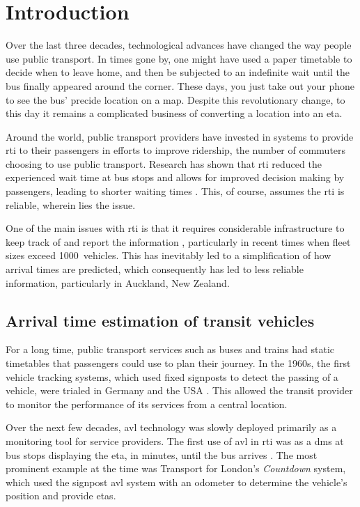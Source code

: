 \glsresetall

\chapter{Introduction}
\label{cha:intro}

Over the last three decades, technological advances have changed the way people use public transport. In times gone by, one might have used a paper timetable to decide when to leave home, and then be subjected to an indefinite wait until the bus finally appeared around the corner. These days, you just take out your phone to see the bus' precide location on a map. Despite this revolutionary change, to this day it remains a complicated business of converting a location into an \gls{eta}.


Around the world, public transport providers have invested in systems to provide \gls{rti} to their passengers in efforts to improve ridership, the number of commuters choosing to use public transport. Research has shown that \gls{rti} reduced the experienced wait time at bus stops \citep{TCRP_2003} and allows for improved decision making by passengers, leading to shorter waiting times \citep{Cats_2015,Lu_2017}. This, of course, assumes the \gls{rti} is reliable, wherein lies the issue.


One of the main issues with \gls{rti} is that it requires considerable infrastructure to keep track of and report the information \citep{TCRP_2003b}, particularly in recent times when fleet sizes exceed 1000~vehicles. This has inevitably led to a simplification of how arrival times are predicted, which consequently has led to less reliable information, particularly in Auckland, New Zealand.


\section{Arrival time estimation of transit vehicles}
\label{sec:literature}

For a long time, public transport services such as buses and trains had static timetables that passengers could use to plan their journey. In the 1960s, the first vehicle tracking systems, which used fixed signposts to detect the passing of a vehicle, were trialed in Germany and the USA \citep{TCRP_1997}. This allowed the transit provider to monitor the \rt{} performance of its services from a central location.


Over the next few decades, \gls{avl} technology was slowly deployed primarily as a monitoring tool for service providers. The first use of \gls{avl} in \gls{rti} was as a \gls{dms} at bus stops displaying the \gls{eta}, in minutes, until the bus arrives \citep{TCRP_2003}. The most prominent example at the time was Transport for London's \emph{Countdown} system, which used the signpost \gls{avl} system with an odometer to determine the vehicle's position and provide \glspl{eta}.



